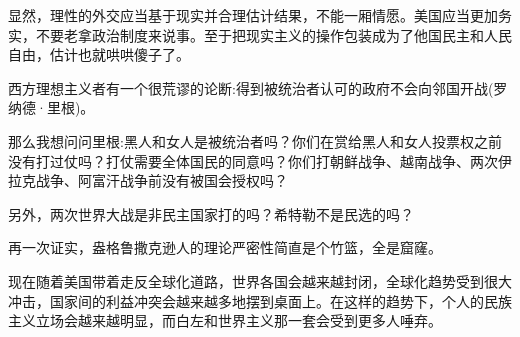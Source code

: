 显然，理性的外交应当基于现实并合理估计结果，不能一厢情愿。美国应当更加务实，不要老拿政治制度来说事。至于把现实主义的操作包装成为了他国民主和人民自由，估计也就哄哄傻子了。

西方理想主义者有一个很荒谬的论断:得到被统治者认可的政府不会向邻国开战(罗纳德·里根)。

那么我想问问里根:黑人和女人是被统治者吗？你们在赏给黑人和女人投票权之前没有打过仗吗？打仗需要全体国民的同意吗？你们打朝鲜战争、越南战争、两次伊拉克战争、阿富汗战争前没有被国会授权吗？

另外，两次世界大战是非民主国家打的吗？希特勒不是民选的吗？

再一次证实，盎格鲁撒克逊人的理论严密性简直是个竹篮，全是窟窿。

现在随着美国带着走反全球化道路，世界各国会越来越封闭，全球化趋势受到很大冲击，国家间的利益冲突会越来越多地摆到桌面上。在这样的趋势下，个人的民族主义立场会越来越明显，而白左和世界主义那一套会受到更多人唾弃。
